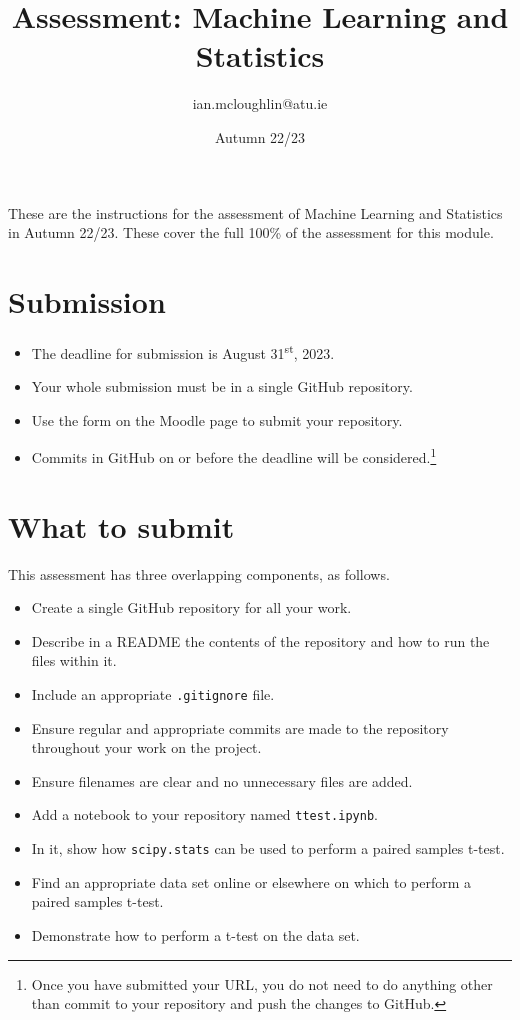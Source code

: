 \documentclass[a4paper]{tufte-handout}
\title{Assessment: Machine Learning and Statistics}
\author{ian.mcloughlin@atu.ie}
\date{Autumn 22/23}
\begin{document}
 
\maketitle

These are the instructions for the assessment of Machine Learning and Statistics in Autumn 22/23.
These cover the full 100\% of the assessment for this module.


\section{Submission}

\begin{itemize}
  \item The deadline for submission is August 31\textsuperscript{st}, 2023. 
  \item Your whole submission must be in a single GitHub repository.
  \item Use the form on the Moodle page to submit your repository.
  \item Commits in GitHub on or before the deadline will be considered.\footnote{Once you have submitted your URL, you do not need to do anything other than commit to your repository and push the changes to GitHub.}
\end{itemize}


\section{What to submit}
This assessment has three overlapping components, as follows.

\begin{itemize}
  \item Create a single GitHub repository for all your work.
  \item Describe in a README the contents of the repository and how to run the files within it.
  \item Include an appropriate \texttt{.gitignore} file.
  \item Ensure regular and appropriate commits are made to the repository throughout your work on the project.
  \item Ensure filenames are clear and no unnecessary files are added.
\end{itemize}

\begin{itemize}
  \item Add a notebook to your repository named \texttt{ttest.ipynb}.
  \item In it, show how \texttt{scipy.stats} can be used to perform a paired samples t-test.
  \item Find an appropriate data set online or elsewhere on which to perform a paired samples t-test.
  \item Demonstrate how to perform a t-test on the data set.
\end{itemize}
\end{document}
